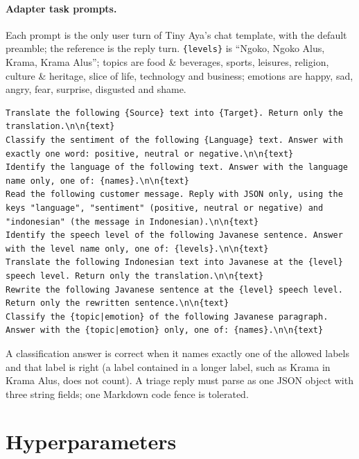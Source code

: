 \documentclass[11pt]{article}
\begin{document}
\paragraph{Adapter task prompts.}\label{app:task-prompts} Each prompt is the only user turn of Tiny Aya's chat
template, with the default preamble; the reference is the reply turn. \texttt{\{levels\}} is ``Ngoko, Ngoko Alus,
Krama, Krama Alus''; topics are food \& beverages, sports, leisures, religion, culture \& heritage, slice of life,
technology and business; emotions are happy, sad, angry, fear, surprise, disgusted and shame.
\begin{lstlisting}
Translate the following {Source} text into {Target}. Return only the translation.\n\n{text}
Classify the sentiment of the following {Language} text. Answer with exactly one word: positive, neutral or negative.\n\n{text}
Identify the language of the following text. Answer with the language name only, one of: {names}.\n\n{text}
Read the following customer message. Reply with JSON only, using the keys "language", "sentiment" (positive, neutral or negative) and "indonesian" (the message in Indonesian).\n\n{text}
Identify the speech level of the following Javanese sentence. Answer with the level name only, one of: {levels}.\n\n{text}
Translate the following Indonesian text into Javanese at the {level} speech level. Return only the translation.\n\n{text}
Rewrite the following Javanese sentence at the {level} speech level. Return only the rewritten sentence.\n\n{text}
Classify the {topic|emotion} of the following Javanese paragraph. Answer with the {topic|emotion} only, one of: {names}.\n\n{text}
\end{lstlisting}
A classification answer is correct when it names exactly one of the allowed labels and that label is right (a
label contained in a longer label, such as Krama in Krama Alus, does not count). A triage reply must parse as one
JSON object with three string fields; one Markdown code fence is tolerated.

\section{Hyperparameters}\label{app:hparams}
\end{document}
